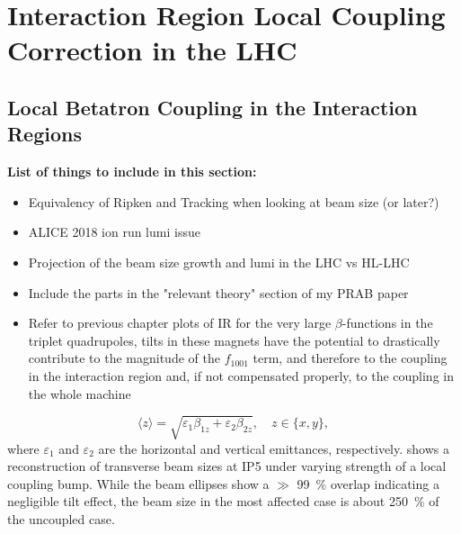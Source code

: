 \chapter{Interaction Region Local Coupling Correction in the LHC} %
\label{chapter:IR_Local_Coupling} %



\section{Local Betatron Coupling in the Interaction Regions}

\textbf{List of things to include in this section:}
\begin{itemize}
    \item Equivalency of Ripken and Tracking when looking at beam size (or later?)
    \item ALICE \num{2018} ion run lumi issue
    \item Projection of the beam size growth and lumi in the LHC vs HL-LHC
    \item Include the parts in the "relevant theory" section of my PRAB paper
    \item Refer to previous chapter plots of IR for the very large \(\beta\)-functions in the triplet quadrupoles, tilts in these magnets have the potential to drastically contribute to the magnitude of the \(f_{1001}\) term, and therefore to the coupling in the interaction region and, if not compensated properly, to the coupling in the whole machine
\end{itemize}

\begin{equation}
    \langle z \rangle = \sqrt{\varepsilon_1 \beta_{1z} + \varepsilon_2 \beta_{2z}}, \quad z \in\{x, y\} ,
    \label{equation:lebedev_beam_size}
\end{equation}
where \(\varepsilon_1\) and \(\varepsilon_2\) are the horizontal and vertical emittances, respectively.
 shows a reconstruction of transverse beam sizes at IP\num{5} under varying strength of a local coupling bump.
While the beam ellipses show a \(\gg\) \qty{99}{\percent} overlap indicating a negligible tilt effect, the beam size in the most affected case is about \qty{250}{\percent} of the uncoupled case.

